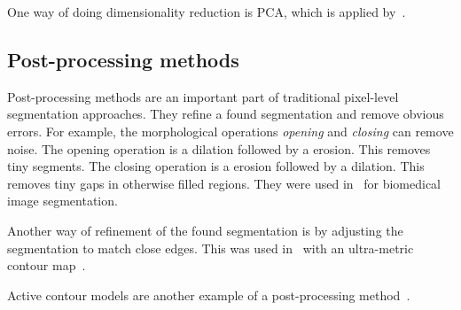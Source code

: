 One way of doing dimensionality reduction is \gls{PCA}, which is applied
by~\cite{chen2011pixel}.


\subsection{Post-processing methods}\label{subsec:post-processing-methods}%
Post-processing methods are an important part of traditional pixel-level
segmentation approaches. They refine a found segmentation and remove obvious
errors. For example, the morphological operations \textit{opening} and
\textit{closing} can remove noise. The opening operation is a dilation followed
by a erosion. This removes tiny segments. The closing operation is a erosion
followed by a dilation. This removes tiny gaps in otherwise filled regions.
They were used in~\cite{chen1998image} for biomedical image segmentation.

Another way of refinement of the found segmentation is by adjusting the
segmentation to match close edges. This was used in~\cite{brox2011object} with
an ultra-metric contour map~\cite{arbelaez2009contours}.

Active contour models are another example of a post-processing
method~\cite{kass1988snakes}.


